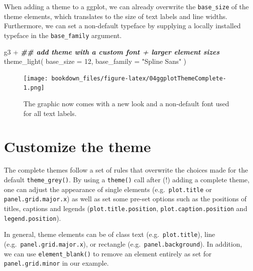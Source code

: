\documentclass[
]{krantz}
\makeatletter
\newenvironment{Shaded}{\begin{snugshade}}{\end{snugshade}}
\newcommand{\AttributeTok}[1]{\textcolor[rgb]{0.61,0.61,0.61}{#1}}
\newcommand{\DecValTok}[1]{\textcolor[rgb]{0.06,0.06,0.06}{#1}}
\newcommand{\DocumentationTok}[1]{\textcolor[rgb]{0.37,0.37,0.37}{\textbf{\textit{#1}}}}
\newcommand{\FunctionTok}[1]{\textcolor[rgb]{0,0,0}{#1}}
\newcommand{\NormalTok}[1]{#1}
\newcommand{\SpecialCharTok}[1]{\textcolor[rgb]{0,0,0}{#1}}
\newcommand{\StringTok}[1]{\textcolor[rgb]{0.5,0.5,0.5}{#1}}
\newenvironment{kframe}{%
\medskip{}
\setlength{\fboxsep}{.8em}
 \def\at@end@of@kframe{}%
 \ifinner\ifhmode%
  \def\at@end@of@kframe{\end{minipage}}%
  \begin{minipage}{\columnwidth}%
 \fi\fi%
 \def\FrameCommand##1{\hskip\@totalleftmargin \hskip-\fboxsep
 \colorbox{shadecolor}{##1}\hskip-\fboxsep
     \hskip-\linewidth \hskip-\@totalleftmargin \hskip\columnwidth}%
 \MakeFramed {\advance\hsize-\width
   \@totalleftmargin\z@ \linewidth\hsize
   \@setminipage}}%
 {\par\unskip\endMakeFramed%
 \at@end@of@kframe}
\renewenvironment{Shaded}{\begin{kframe}}{\end{kframe}}
\makeatother
\begin{document}
When adding a theme to a ggplot, we can already overwrite the \texttt{base\_size} of the theme elements, which translates to the size of text labels and line widths. Furthermore, we can set a non-default typeface by supplying a locally installed typeface in the \texttt{base\_family} argument.

\begin{Shaded}
\begin{Highlighting}[]
\NormalTok{g3 }\SpecialCharTok{+}
  \DocumentationTok{\#\# add theme with a custom font + larger element sizes}
  \FunctionTok{theme\_light}\NormalTok{(}
    \AttributeTok{base\_size =} \DecValTok{12}\NormalTok{, }\AttributeTok{base\_family =} \StringTok{"Spline Sans"}
\NormalTok{  )}
\end{Highlighting}
\end{Shaded}

\begin{figure}
\centering
\texttt{[image: bookdown\_files/figure-latex/04ggplotThemeComplete-1.png]}
\caption{\label{fig:04ggplotThemeComplete}The graphic now comes with a new look and a non-default font used for all text labels.}
\end{figure}

\hypertarget{custom-theming}{%
\section{Customize the theme}\label{custom-theming}}

The complete themes follow a set of rules that overwrite the choices made for the default \texttt{theme\_grey()}. By using a \texttt{theme()} call after (!) adding a complete theme, one can adjust the appearance of single elements (e.g.~\texttt{plot.title} or \texttt{panel.grid.major.x}) as well as set some pre-set options such as the positions of titles, captions and legends (\texttt{plot.title.position}, \texttt{plot.caption.position} and \texttt{legend.position}).

In general, theme elements can be of class text (e.g.~\texttt{plot.title}), line (e.g.~\texttt{panel.grid.major.x}), or rectangle (e.g.~\texttt{panel.background}). In addition, we can use \texttt{element\_blank()} to remove an element entirely as set for \texttt{panel.grid.minor} in our example.
\end{document}
